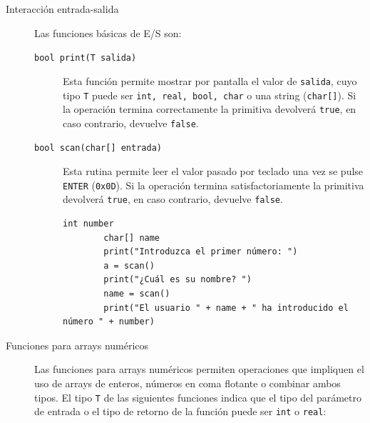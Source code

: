 \documentclass[11pt, english]{article}
\begin{document}
\begin{description}
	\item [Interacción entrada-salida] Las funciones básicas de E/S son:
	\begin{description}

		\item[\texttt{bool print(T salida)}] Esta función permite mostrar por pantalla el valor de \texttt{salida}, cuyo tipo \texttt{T} puede ser \texttt{int, real, bool, char} o una string (\texttt{char[]}). Si la operación termina correctamente la primitiva devolverá \texttt{true}, en caso contrario, devuelve \texttt{false}.
		\item[\texttt{bool scan(char[] entrada)}] Esta rutina permite leer el valor pasado por teclado una vez se pulse \texttt{ENTER} (\texttt{0x0D}). Si la operación termina satisfactoriamente la primitiva devolverá \texttt{true}, en caso contrario, devuelve \texttt{false}.

		\begin{lstlisting}[caption=Ejemplo de uso de la función \texttt{print()} y \texttt{scan()}]
		int number
		char[] name
		print("Introduzca el primer número: ")
		a = scan()
		print("¿Cuál es su nombre? ")
		name = scan()
		print("El usuario " + name + " ha introducido el número " + number)
		\end{lstlisting}
	\end{description}


	\item [Funciones para arrays numéricos] Las funciones para arrays numéricos permiten operaciones que impliquen el uso de arrays de enteros, números en coma flotante o combinar ambos tipos. El tipo \texttt{T} de las siguientes funciones indica que el tipo del parámetro de entrada o el tipo de retorno de la función puede ser \texttt{int} o \texttt{real}:


\end{description}
\end{document}
